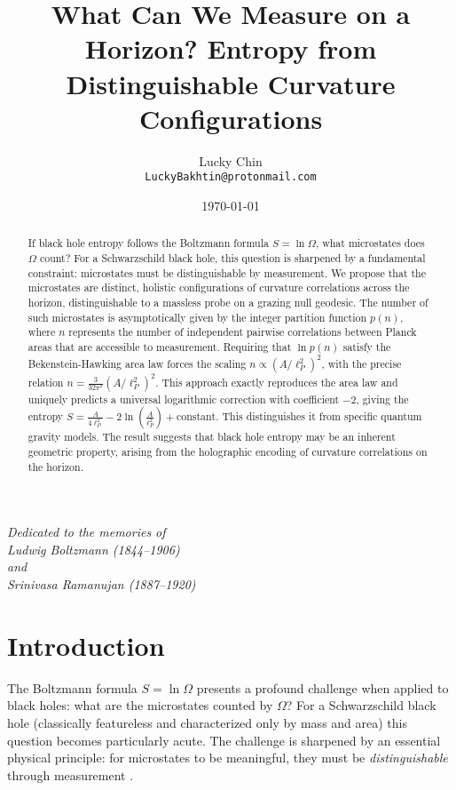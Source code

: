 \documentclass[12pt, letterpaper]{article}
\title{What Can We Measure on a Horizon? Entropy from Distinguishable Curvature Configurations}
\author{Lucky Chin \\ \texttt{LuckyBakhtin@protonmail.com}}
\date{\today}
\begin{document}
\maketitle

\begin{center}
    \textit{Dedicated to the memories of \\
    Ludwig Boltzmann (1844--1906) \\
    and \\
    Srinivasa Ramanujan (1887--1920)}
\end{center}
\vspace{0.5cm}

\begin{abstract}
If black hole entropy follows the Boltzmann formula $S = \ln \Omega$, what microstates does $\Omega$ count? For a Schwarzschild black hole, this question is sharpened by a fundamental constraint: microstates must be distinguishable by measurement.
We propose that the microstates are distinct, holistic configurations of curvature correlations across the horizon, distinguishable to a massless probe on a grazing null geodesic. The number of such microstates is asymptotically given by the integer partition function $p(n)$, where $n$ represents the number of independent pairwise correlations between Planck areas that are accessible to measurement. Requiring that $\ln p(n)$ satisfy the Bekenstein-Hawking area law forces the scaling $n \propto (A/\ell_P^2)^2$, with the precise relation $n = \frac{3}{32\pi^2} (A/\ell_P^2)^2$. This approach exactly reproduces the area law and uniquely predicts a universal logarithmic correction with coefficient $-2$, giving the entropy $S = \frac{A}{4\ell_P^2} - 2\ln\left( \frac{A}{\ell_P^2} \right) + \text{constant}$. This distinguishes it from specific quantum gravity models. The result suggests that black hole entropy may be an inherent geometric property, arising from the holographic encoding of curvature correlations on the horizon.
\end{abstract}

\section{Introduction}

The Boltzmann formula $S = \ln \Omega$ presents a profound challenge when applied to black holes: what are the microstates counted by $\Omega$? For a Schwarzschild black hole (classically featureless and characterized only by mass and area) this question becomes particularly acute. The challenge is sharpened by an essential physical principle: for microstates to be meaningful, they must be \emph{distinguishable} through measurement \cite{Bekenstein1972, Bekenstein1973}.
\end{document}
